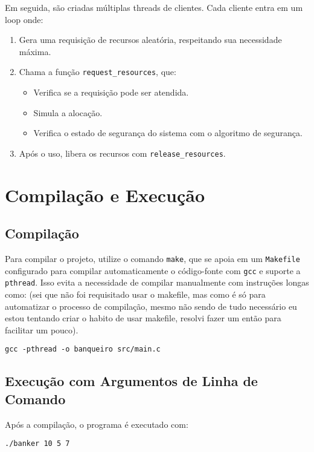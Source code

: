 \documentclass[12pt]{article}
\begin{document}
Em seguida, são criadas múltiplas threads de clientes. Cada cliente entra em um loop onde:
\begin{enumerate}
  \item Gera uma requisição de recursos aleatória, respeitando sua necessidade máxima.
  \item Chama a função \texttt{request\_resources}, que:
    \begin{itemize}
      \item Verifica se a requisição pode ser atendida.
      \item Simula a alocação.
      \item Verifica o estado de segurança do sistema com o algoritmo de segurança.
    \end{itemize}
  \item Após o uso, libera os recursos com \texttt{release\_resources}.
\end{enumerate}

\section{Compilação e Execução}
\subsection{Compilação}

Para compilar o projeto, utilize o comando \texttt{make}, que se apoia em um \texttt{Makefile} configurado para compilar automaticamente o código-fonte com \texttt{gcc} e suporte a \texttt{pthread}. Isso evita a necessidade de compilar manualmente com instruções longas como:
(sei que não foi requisitado usar o makefile, mas como é só para automatizar o processo de compilação, mesmo não sendo de tudo necessário eu estou tentando criar o habito de usar makefile, resolvi fazer um então para facilitar um pouco).

\begin{lstlisting}
gcc -pthread -o banqueiro src/main.c
\end{lstlisting}

\subsection{Execução com Argumentos de Linha de Comando}

Após a compilação, o programa é executado com:

\begin{lstlisting}
./banker 10 5 7
\end{lstlisting}
\end{document}
